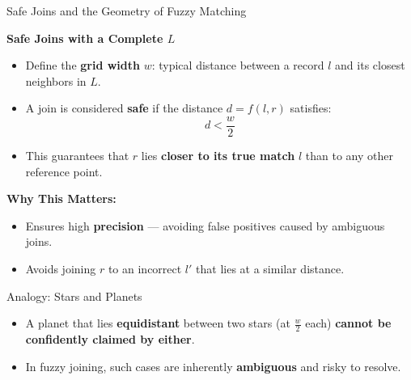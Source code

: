\documentclass[8pt]{beamer} %
\begin{document}
\begin{frame}{Safe Joins and the Geometry of Fuzzy Matching}
	
	\textbf{Safe Joins with a Complete $L$}
	\begin{itemize}
		\item Define the \textbf{grid width} $w$: typical distance between a record $l$ and its closest neighbors in $L$.
		\item A join is considered \textbf{safe} if the distance $d = f(l, r)$ satisfies:
		\[
		d < \frac{w}{2}
		\]
		\item This guarantees that $r$ lies \textbf{closer to its true match} $l$ than to any other reference point.
	\end{itemize}
	
	\vspace{0.5em}
	\textbf{Why This Matters:}
	\begin{itemize}
		\item Ensures high \textbf{precision} — avoiding false positives caused by ambiguous joins.
		\item Avoids joining $r$ to an incorrect $l'$ that lies at a similar distance.
	\end{itemize}

	\begin{block}{Analogy: Stars and Planets}
		\begin{itemize}
			\item A planet that lies \textbf{equidistant} between two stars (at $\frac{w}{2}$ each) \textbf{cannot be confidently claimed by either}.
			\item In fuzzy joining, such cases are inherently \textbf{ambiguous} and risky to resolve.
		\end{itemize}
	\end{block}
\end{frame}
\end{document}
